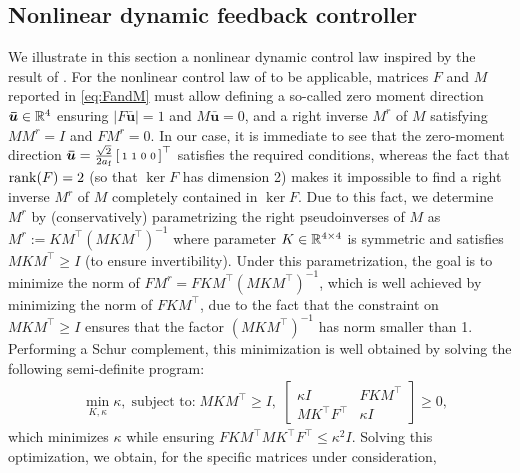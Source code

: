 
\subsection{Nonlinear dynamic feedback controller}

We illustrate in this section a nonlinear dynamic control law inspired by the
result of \cite{2020e-MicCenZacFra}. For the nonlinear control law of \cite{2020e-MicCenZacFra} to be applicable, matrices $F$ and $M$ reported in \eqref{eq:FandM} must allow defining a so-called zero moment direction $\boldsymbol{\bar u} \in {\mathbb R}^4$ ensuring $|F\boldsymbol{\bar u}| = 1$ and $M \boldsymbol{\bar u}=0$, and a right inverse $M^r$ of $M$ satisfying $M M^r = I$ and $FM^r=0$. In our case, it is immediate to see that the zero-moment direction
$\boldsymbol{\bar u} = \frac{\sqrt{2}}{2a_{\text{f}}}\left[ \begin{smallmatrix}1&1&0&0 \end{smallmatrix} \right]^\top$ satisfies the required conditions, whereas the fact that $\operatorname{rank}(F) = 2$ (so that $\ker F$ has dimension 2) makes it impossible to find a right inverse $M^r$ of $M$ completely contained in $\ker F$. Due to this fact, we determine $M^r$ by (conservatively) parametrizing the right pseudoinverses of $M$ as $M^r := KM^\top ( MKM^\top)^{-1}$ where parameter $K \in {\mathbb R}^{4\times 4}$ is symmetric and satisfies $MKM^\top \geq I$ (to ensure invertibility). Under this parametrization, the goal is to minimize the norm of $FM^r = F KM^\top ( MKM^\top)^{-1}$, which is well achieved by minimizing the norm of $F KM^\top$, due to the fact that the constraint on $MKM^\top \geq I$ ensures that the factor $( MKM^\top)^{-1}$ has norm smaller than 1.
Performing a Schur complement, this minimization is well obtained by solving the following semi-definite program:
\begin{align*}
&  \min_{K, \kappa} \kappa, \; \mbox{subject to:}
\;  M K M^\top\! \geq \!I, \; 
  \begin{bmatrix}
  \kappa I  &\! F K M^\top \\ 
   M K^\top F^\top &\! \kappa I
  \end{bmatrix}\! \geq\! 0,
\end{align*}
which minimizes $\kappa$ while ensuring $F K M^\top M K^\top F^\top \leq \kappa^2 I$. Solving this optimization, we obtain, for the specific matrices under consideration,
